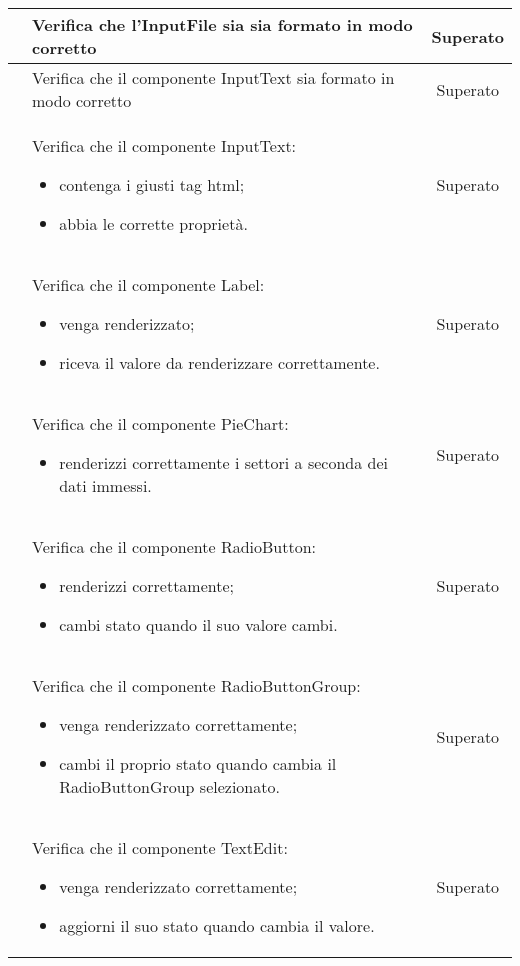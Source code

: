 \begin{longtable}{|c|P{9cm}|c|}
	\hline {}\label{tu-inputfile} & Verifica che l'InputFile sia sia formato in modo corretto & Superato \\
	\hline {} & Verifica che il componente InputText sia formato in modo corretto & Superato \\
	\hline {} & Verifica che il componente InputText:
	\begin{itemize}
		\item contenga i giusti tag html;
		\item abbia le corrette proprietà.
	\end{itemize}
	& Superato \\
	\hline {} & Verifica che il componente Label:
	\begin{itemize}
		\item venga renderizzato;
		\item riceva il valore da renderizzare correttamente.
	\end{itemize}
	& Superato \\
	\hline {} & Verifica che il componente PieChart:
	\begin{itemize}
		\item renderizzi correttamente i settori a seconda dei dati immessi.
	\end{itemize}
	& Superato \\
	\hline {} & Verifica che il componente RadioButton:
	\begin{itemize}
		\item renderizzi correttamente;
		\item cambi stato quando il suo valore cambi.
	\end{itemize}
	& Superato \\
	\hline {} & Verifica che il componente RadioButtonGroup:
	\begin{itemize}
		\item venga renderizzato correttamente;
		\item cambi il proprio stato quando cambia il RadioButtonGroup selezionato.
	\end{itemize}
	& Superato \\
	\hline {} & Verifica che il componente TextEdit:
	\begin{itemize}
		\item venga renderizzato correttamente;
		\item aggiorni il suo stato quando cambia il valore.
	\end{itemize}
	& Superato \\

\end{longtable}
